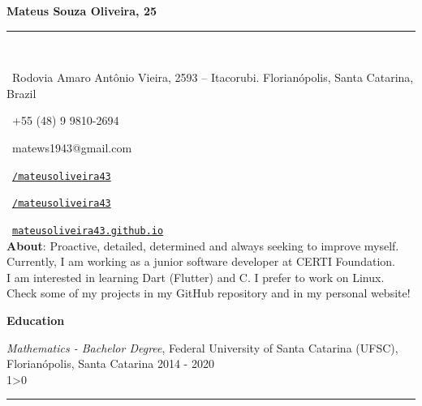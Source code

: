 \documentclass[a4paper,10pt]{article}
\makeatletter
\newcommand{\professional}{Mateus Souza Oliveira}
\newcommand{\age}{25}
\newcommand{\address}{Rodovia Amaro Antônio Vieira, 2593 -- Itacorubi. Florianópolis, Santa Catarina, Brazil}
\newcommand{\phone}{+55 (48) 9 9810-2694}
\newcommand{\email}{matews1943@gmail.com}
\newcommand{\about}{
    Proactive, detailed, determined and always seeking to improve myself. Currently, I am working as a junior software developer at CERTI Foundation. \\

    I am interested in learning Dart (Flutter) and C. I prefer to work on Linux. Check some of my projects in my GitHub repository and in my personal website!
	\vspace{2\baselineskip}
}
\newcommand{\createSection}[4][0]{
    \noindent
	\begin{minipage}{0.16\linewidth}
		\large{\textbf{#2}}
		\vspace{#3\baselineskip}
	\end{minipage}
	\hfill
	\begin{minipage}{0.79\linewidth}
		#4
		\ifnum0#1>0 { \hrule {\ } } \fi
	\end{minipage}
	\vspace{\baselineskip}
}
\makeatother
\begin{document}
	\begin{minipage}{0.65\linewidth}
		\Huge{\bf \professional, \age}\\\vspace{-1.75\baselineskip}

		\noindent\rule{\textwidth}{1.5pt} {\ }\\\vspace{-1.8\baselineskip}

		\large{
		\faMapMarker \ \address \\
		\begin{minipage}{0.5\linewidth}
			\faWhatsapp \ \phone
		\end{minipage}
		\begin{minipage}{0.5\linewidth}
			\faEnvelope \ \email
		\end{minipage}
		\begin{minipage}{0.5\linewidth}
			\faLinkedinSquare \ \href{https://www.linkedin.com/in/mateusoliveira43/}{\texttt{/mateusoliveira43}}
		\end{minipage}
		\begin{minipage}{0.5\linewidth}
			\faGithub \ \href{https://github.com/mateusoliveira43}{\texttt{/mateusoliveira43}}
		\end{minipage}
		\faLink \ \href{https://mateusoliveira43.github.io/}{\texttt{mateusoliveira43.github.io}}\\
		\vfill
		\textbf{About}:\about
		}
	\end{minipage}
	\vspace{\baselineskip}

    \createSection[1]{Education}{2}{
		\textit{Mathematics - Bachelor Degree}, Federal University of Santa Catarina (UFSC), Florianópolis, Santa Catarina \hfill 2014 - 2020 \\
	}
\end{document}
